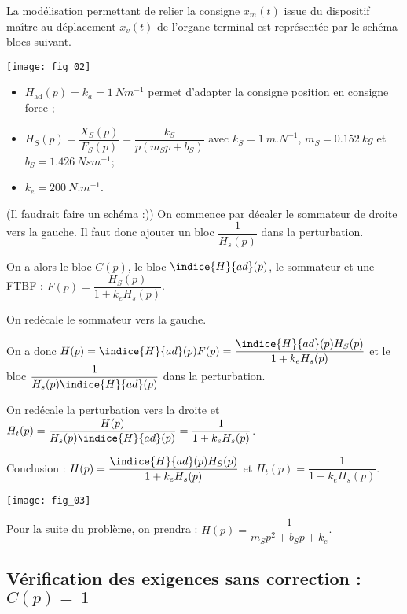 La modélisation permettant de relier la consigne $x_m(t)$ issue du dispositif maître au déplacement
$x_v(t)$ de l’organe terminal est représentée par le schéma-blocs suivant.

\begin{center}
\texttt{[image: fig\_02]}
\end{center}

\begin{itemize}
\item $H_{\text{ad}}(p) = k_a = \SI{1}{Nm^{-1}}$ permet d’adapter la consigne position en consigne force ;
\item $H_S(p) = \dfrac{X_S(p)}{F_S(p)}=\dfrac{k_S}{p\left( m_S p +b_S\right)}$ avec $k_S = \SI{1}{m.N^{-1}}$, $m_S = \SI{0,152}{kg}$ et $b_S = \SI{1,426}{Nsm^{-1}}$;
\item $k_e = \SI{200}{N.m^{-1}}$.
\end{itemize}


\ifprof
\begin{corrige} (Il faudrait faire un schéma :))
On commence par décaler le sommateur de droite vers la gauche. Il faut donc ajouter un bloc $\dfrac{1}{H_s(p) }$ dans la perturbation. 

On a alors le bloc $C(p)$, le bloc $\indice{H}{ad}(p)$, le sommateur et une FTBF : $F(p)=\dfrac{H_S(p)}{1+k_eH_s(p)}$.

On redécale le sommateur vers la gauche. 

On a donc $H(p)=\indice{H}{ad}(p) F(p) = \dfrac{ \indice{H}{ad}(p) H_S(p)}{1+k_eH_s(p)}$ et le bloc   $\dfrac{1}{H_s(p) \indice{H}{ad}(p)}$  dans la perturbation. 

On redécale la perturbation vers la droite et $H_t(p)=  \dfrac{H(p)}{H_s(p) \indice{H}{ad}(p)} =  \dfrac{1}{1+k_eH_s(p)}$.

Conclusion : $H(p)= \dfrac{ \indice{H}{ad}(p) H_S(p)}{1+k_eH_s(p)}$ et 
$H_t(p)=  \dfrac{1}{1+k_eH_s(p)}$.
\end{corrige}
\else
\fi


\begin{marginfigure}
\texttt{[image: fig\_03]}
\end{marginfigure}

Pour la suite du problème, on prendra : $H(p) = \dfrac{1}{m_S p^2 + b_S p + k_e}$.

\subsection*{Vérification des exigences sans correction : $C(p) =~1$}

